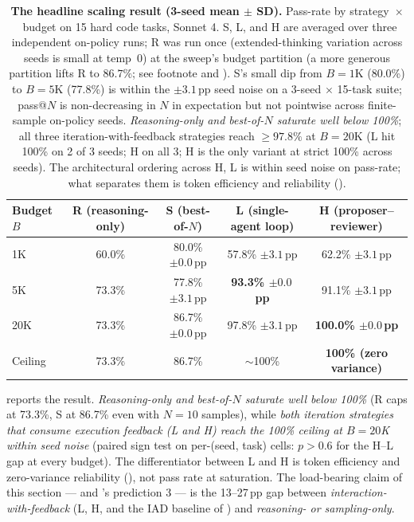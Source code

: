 \documentclass[11pt]{article}
\begin{document}
\begin{table}[t]
\centering
\caption{\textbf{The headline scaling result (3-seed mean $\pm$ SD).} Pass-rate by strategy~$\times$~budget on 15 hard code tasks, Sonnet 4. S, L, and H are averaged over three independent on-policy runs; R was run once (extended-thinking variation across seeds is small at temp~0) at the sweep's budget partition (a more generous partition lifts R to $86.7\%$; see footnote and ). S's small dip from $B{=}1$K (80.0\%) to $B{=}5$K (77.8\%) is within the $\pm 3.1$\,pp seed noise on a 3-seed $\times$ 15-task suite; pass@$N$ is non-decreasing in $N$ in expectation but not pointwise across finite-sample on-policy seeds. \emph{Reasoning-only and best-of-$N$ saturate well below 100\%}; all three iteration-with-feedback strategies reach $\geq97.8\%$ at $B{=}20$K (L hit 100\% on 2 of 3 seeds; H on all 3; H is the only variant at strict 100\% across seeds). The architectural ordering across H, L is within seed noise on pass-rate; what separates them is token efficiency and reliability ().}
\label{tab:scaling-curves}
\small
\begin{tabular}{lcccc}
\toprule
Budget $B$ & R (reasoning-only) & S (best-of-$N$) & L (single-agent loop) & H (proposer--reviewer) \\
\midrule
1K   & 60.0\% & 80.0\% $\pm 0.0$\,pp & 57.8\% $\pm 3.1$\,pp & 62.2\% $\pm 3.1$\,pp \\
5K   & 73.3\% & 77.8\% $\pm 3.1$\,pp & \textbf{93.3\% $\pm 0.0$\,pp} & 91.1\% $\pm 3.1$\,pp \\
20K  & 73.3\% & 86.7\% $\pm 0.0$\,pp & 97.8\% $\pm 3.1$\,pp & \textbf{100.0\% $\pm 0.0$\,pp} \\
\midrule
Ceiling & 73.3\% & 86.7\% & $\sim$100\% & \textbf{100\% (zero variance)} \\
\bottomrule
\end{tabular}
\end{table}

 reports the result. \emph{Reasoning-only and best-of-$N$ saturate well below 100\%} (R caps at 73.3\%, S at 86.7\% even with $N{=}10$ samples), while \emph{both iteration strategies that consume execution feedback (L and H) reach the 100\% ceiling at $B{=}20$K within seed noise} (paired sign test on per-(seed, task) cells: $p{>}0.6$ for the H--L gap at every budget). The differentiator between L and H is token efficiency and zero-variance reliability (), not pass rate at saturation. The load-bearing claim of this section --- and 's prediction 3 --- is the 13--27\,pp gap between \emph{interaction-with-feedback} (L, H, and the IAD baseline of ) and \emph{reasoning- or sampling-only}.
\end{document}
